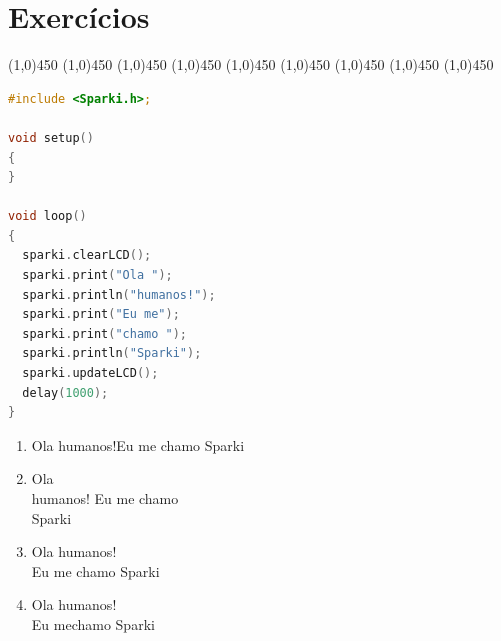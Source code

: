 \section{Exercícios}

    \begin{center}
    \line(1,0){450}
    \vspace{0.2cm}   
    \line(1,0){450}
    \vspace{0.2cm}   
    \line(1,0){450}
    \vspace{0.2cm}   
    \line(1,0){450}
    \vspace{0.2cm}   
    \line(1,0){450}
    \vspace{0.2cm}   
    \line(1,0){450}
    \vspace{0.2cm}   
    \line(1,0){450}
    \vspace{0.2cm}   
    \line(1,0){450}
    \vspace{0.2cm}   
    \line(1,0){450}
    \vspace{0.5cm}   
    \end{center}


\begin{lstlisting}[language=C]
#include <Sparki.h>;

void setup()
{
}

void loop()
{
  sparki.clearLCD();
  sparki.print("Ola ");
  sparki.println("humanos!");
  sparki.print("Eu me");
  sparki.print("chamo ");
  sparki.println("Sparki");
  sparki.updateLCD();
  delay(1000);  
}
\end{lstlisting}

\begin{enumerate}
        \item Ola humanos!Eu me chamo Sparki
        \item Ola \\
        humanos! Eu me chamo \\
        Sparki
        \item Ola humanos! \\
        Eu me chamo Sparki
        \item Ola humanos! \\
        Eu mechamo Sparki
    \end{enumerate}

